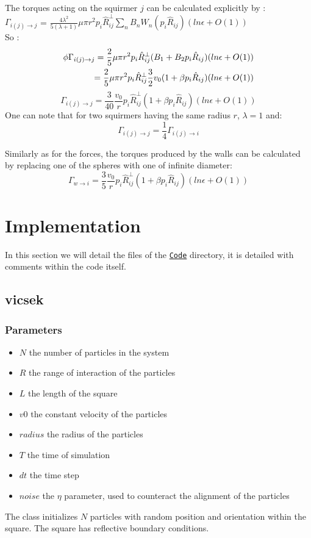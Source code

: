 \documentclass{article}
\begin{document}
The torques acting on the squirmer $j$ can be calculated explicitly by : \\
$\Gamma_{i(j)\rightarrow j}$ = $\frac{4 \lambda^2}{5(\lambda +1)} \mu \pi r^2 p_i\hat{R}_{ij}^{\perp}\sum_{n} B_n W_n(p_i\hat{R}_{ij}) (ln \epsilon + O(1))$ \cite{Brumley}
\\ So :
\begin{align*}
    \footnotesize
    \phi \Gamma_{i(j)\rightarrow j} = \frac{2}{5}\mu\pi r^2p_i\hat{R}_{ij}^{\perp}(B_1 + B_2 p_i\hat{R}_{ij})(ln \epsilon + O(1))\\
    = \frac{2}{5}\mu\pi r^2p_i\hat{R}_{ij}^{\perp}\frac{3}{2}v_0(1 + \beta p_i\hat{R}_{ij})(ln \epsilon + O(1))
\end{align*}
\begin{equation*}
    \boxed{\Gamma_{i(j)\rightarrow j} = \frac{3}{40}\frac{v_0}{r}p_i\hat{R}_{ij}^{\perp}(1 + \beta p_i\hat{R}_{ij})(ln \epsilon + O(1))}
\end{equation*}
One can note that for two squirmers having the same radius $r$, $\lambda = 1$ and:
$$\Gamma_{i(j)\rightarrow j} = \frac{1}{4}\Gamma_{i(j)\rightarrow i}$$

Similarly as for the forces, the torques produced by the walls can be calculated by replacing one of the spheres with one of infinite diameter:
\begin{equation*}
    \boxed{\Gamma_{w\rightarrow i} = \frac{3}{5} \frac{v_0}{r}p_i\hat{R}_{ij}^{\perp}(1 + \beta p_i\hat{R}_{ij})(ln \epsilon + O(1))}
\end{equation*}



\section{Implementation}
In this section we will detail the files of the \texttt{\href{https://github.com/master-csmi/2024-m1-nemo/tree/main/Code}{Code}} directory,
it is detailed with comments within the code itself.
\subsection{vicsek}
\subsubsection*{Parameters}
\begin{itemize}
    \item $N$ the number of particles in the system
    \item $R$ the range of interaction of the particles
    \item $L$ the length of the square
    \item $v0$ the constant velocity of the particles
    \item $radius$ the radius of the particles
    \item $T$ the time of simulation
    \item $dt$ the time step
    \item $noise$ the $\eta$ parameter, used to counteract the alignment of the particles
\end{itemize}
The class initializes $N$ particles with random position and orientation within the square. The square has reflective boundary conditions.
\end{document}
